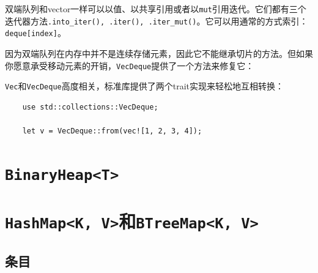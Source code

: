 双端队列和vector一样可以以值、以共享引用或者以\texttt{mut}引用迭代。它们都有三个迭代器方法\texttt{.into\_iter(), .iter(), .iter\_mut()}。它可以用通常的方式索引：\texttt{deque[index]}。

因为双端队列在内存中并不是连续存储元素，因此它不能继承切片的方法。但如果你愿意承受移动元素的开销，\texttt{VecDeque}提供了一个方法来修复它：


\texttt{Vec}和\texttt{VecDeque}高度相关，标准库提供了两个trait实现来轻松地互相转换：


\begin{verbatim}
    use std::collections::VecDeque;

    let v = VecDeque::from(vec![1, 2, 3, 4]);
\end{verbatim}

\section{\texttt{BinaryHeap<T>}}

\section{\texttt{HashMap<K, V>}和\texttt{BTreeMap<K, V>}}

\subsection{条目}\label{entry}